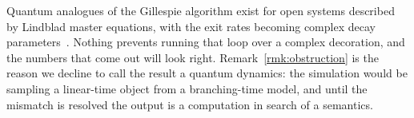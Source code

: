 Quantum analogues of the Gillespie algorithm exist for open systems
described by Lindblad master equations, with the exit rates becoming
complex decay parameters~\cite{cao2021quantum}.  Nothing prevents running
that loop over a complex decoration, and the numbers that come out will
look right.  Remark~\ref{rmk:obstruction} is the reason we decline to call
the result a quantum dynamics: the simulation would be sampling a linear-time
object from a branching-time model, and until the mismatch is resolved the
output is a computation in search of a semantics.

